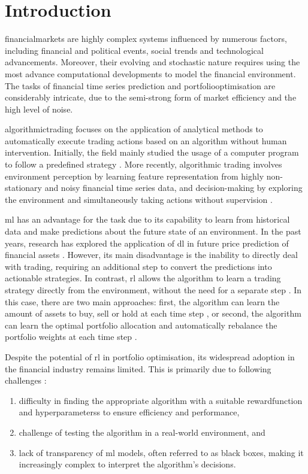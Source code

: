 \chapter{Introduction} \label{ch:introduction}

\Gls{financialmarkets} are highly complex systems influenced by numerous factors, including financial and political events, social trends and technological advancements. Moreover, their evolving and stochastic nature requires using the most advance computational developments to model the financial environment. The tasks of financial time series prediction and \Gls{portfoliooptimisation} are considerably intricate, due to the semi-strong form of market efficiency and the high level of noise. \cite{Shen2020}

\Gls{algorithmictrading} focuses on the application of analytical methods to automatically execute trading actions based on an algorithm without human intervention. Initially, the field mainly studied the usage of a computer program to follow a predefined strategy \cite{Lei2020}. More recently, algorithmic trading involves environment perception by learning feature representation from highly non-stationary and noisy financial time series data, and decision-making by exploring the environment and simultaneously taking actions without supervision \cite{Ma2021}.

\acrfull{ml} has an advantage for the task due to its capability to learn from historical data and make predictions about the future state of an environment. In the past years, research has explored the application of \acrfull{dl} in future price prediction of financial assets \cite{Hasan2024,Nti2020,Shen2020,Wu2023}. However, its main disadvantage is the inability to directly deal with trading, requiring an additional step to convert the predictions into actionable strategies. In contrast, \acrfull{rl} allows the algorithm to learn a trading strategy directly from the environment, without the need for a separate step \cite{Moody2001,Yang2020}. In this case, there are two main approaches: first, the algorithm can learn the amount of assets to buy, sell or hold at each time step \cite{Liu2018}, or second, the algorithm can learn the optimal portfolio allocation and automatically rebalance the portfolio weights at each time step \cite{Guan2021}.

Despite the potential of \acrshort{rl} in portfolio optimisation, its widespread adoption in the financial industry remains limited. This is primarily due to following challenges \cite{Cortes2024}:
\begin{enumerate}
    \item difficulty in finding the appropriate algorithm with a suitable \gls{rewardfunction} and \glspl{hyperparameters} to ensure efficiency and performance,
    \item challenge of testing the algorithm in a real-world environment, and
    \item lack of transparency of \acrshort{ml} models, often referred to as black boxes, making it increasingly complex to interpret the algorithm's decisions. 
\end{enumerate}

